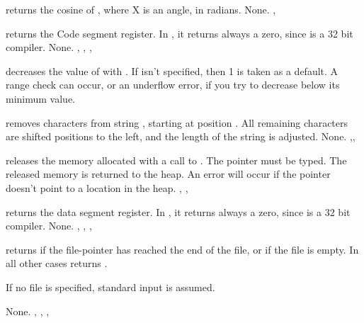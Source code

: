\documentclass{report}
\begin{document}
\html{}

{ returns the cosine of , where X is an angle, in radians.}
{None.}
{, }

\html{}

{ returns the Code segment register. In \fpc, it returns always a
zero, since \fpc is a 32 bit compiler.}
{None.}
{, , , }

\html{}

{ decreases the value of  with .
If  isn't specified, then 1 is taken as a default.}
{A range check can occur, or an underflow error, if you try to decrease 
below its minimum value.}
{}

\html{}

{ removes  characters from string , starting
at position . All remaining characters are shifted  
positions to the left, and the length of the string is adjusted.
}
{None.}
{,,}

\html{}

{ releases the memory allocated with a call to .
The pointer  must be typed. The released memory is returned to the
heap.}
{An error will occur if the pointer doesn't point to a location in the
heap.}
{, , }

\html{}

{ returns the data segment register. In \fpc, it returns always a
zero, since \fpc is a 32 bit compiler.}
{None.}
{, , , }

\html{}

{ returns  if the file-pointer has reached the end of the
file, or if the file is empty. In all other cases  returns
.

If no file  is specified, standard input is assumed.}
{None.}
{, , , }
\end{document}
